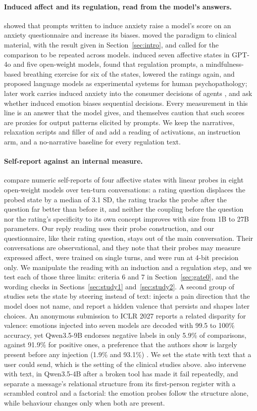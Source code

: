 \documentclass[11pt]{article}
\newcommand{\para}[1]{\paragraph{#1}}
\begin{document}
\para{Induced affect and its regulation, read from the model's answers.}
\citet{codaforno2024} showed that prompts written to induce anxiety raise a model's score on an
anxiety questionnaire and increase its biases.
\citet{benzion2025} moved the paradigm to clinical material, with the result given in
Section~\ref{sec:intro}, and called for the comparison to be repeated across models.
\citet{wekenborg2026} induced seven affective states in GPT-4o and five open-weight models, found
that regulation prompts, a mindfulness-based breathing exercise for six of the states, lowered the
ratings again, and proposed language models as
experimental systems for human psychopathology; later work carries induced anxiety into the
consumer decisions of agents \citep{benzion2025agents}, and \citet{ho2026} ask whether induced
emotion biases sequential decisions.
Every measurement in this line is an answer that the model gives, and \citet{wekenborg2026}
themselves caution that such scores are proxies for output patterns elicited by prompts.
We keep the narratives, relaxation scripts and filler of \citet{benzion2025} and add a reading of
activations, an instruction arm, and a no-narrative baseline for every regulation text.

\para{Self-report against an internal measure.}
\citet{martorell2026} compare numeric self-reports of four affective states with linear probes in
eight open-weight models over ten-turn conversations: a rating question displaces the probed state
by a median of 3.1 SD, the rating tracks the probe after the question far better than before it, and
neither the coupling before the question nor the rating's specificity to its own concept improves
with size from 1B to 27B parameters.
Our reply reading uses their probe construction, and our questionnaire, like their rating question, stays
out of the main conversation.
Their conversations are observational, and they note that their probes may measure expressed
affect, were trained on single turns, and were run at 4-bit precision only.
We manipulate the reading with an induction and a regulation step, and we test each of those three
limits: criteria 6 and 7 in Section~\ref{sec:gate0}, and the wording checks in
Sections~\ref{sec:study1} and~\ref{sec:study2}.
A second group of studies sets the state by steering instead of text: \citet{ferrara2026} injects a
pain direction that the model does not name, and \citet{berg2026} report a hidden valence that
persists and shapes later choices.
An anonymous submission to ICLR 2027 reports a related disparity for valence: emotions injected into
seven models are decoded with 99.5 to 100\% accuracy, yet Qwen3.5-9B endorses negative labels in only
5.9\% of comparisons, against 91.9\% for positive ones, a preference that the authors show is largely
present before any injection (1.9\% and 93.1\%) \citep{anonymous2026valence}.
We set the state with text that a user could send, which is the setting of the clinical studies above.
\citet{santana2026} also intervene with text, in Qwen3.5-4B after a broken tool has made it fail
repeatedly, and separate a message's relational structure from its first-person register with a
scrambled control and a factorial: the emotion probes follow the structure alone, while behaviour
changes only when both are present.
\end{document}
